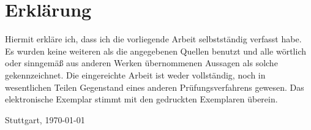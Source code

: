 \documentclass[parskip=half+,fontsize=12pt]{scrartcl}
\begin{document}
\section*{Erklärung}

Hiermit erkläre ich, dass ich die vorliegende Arbeit selbstständig verfasst habe.
Es wurden keine weiteren als die angegebenen Quellen benutzt und alle wörtlich oder sinngemäß aus anderen Werken übernommenen Aussagen als solche gekennzeichnet.
Die eingereichte Arbeit ist weder vollständig, noch in wesentlichen Teilen Gegenstand eines anderen Prüfungsverfahrens gewesen.
Das elektronische Exemplar stimmt mit den gedruckten Exemplaren überein.

\vspace{4em}

Stuttgart, \today
\end{document}
